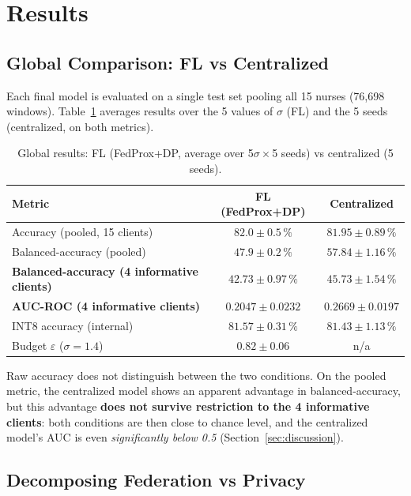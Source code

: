 \documentclass{acmart}
\begin{document}
\section{Results}
\label{sec:results}

\subsection{Global Comparison: FL vs Centralized}

Each final model is evaluated on a single test set pooling all 15 nurses
(76,698 windows). Table~\ref{tab:main} averages results over the 5 values of
$\sigma$ (FL) and the 5 seeds (centralized, on both metrics).

\begin{table}[h!]
\centering
\small
\caption{Global results: FL (FedProx+DP, average over 5$\sigma\times$5 seeds) vs
centralized (5 seeds).}
\label{tab:main}
\begin{tabular}{lcc}
\toprule
Metric & FL (FedProx+DP) & Centralized \\
\midrule
Accuracy (pooled, 15 clients)               & $82.0\pm0.5\,\%$  & $81.95\pm0.89\,\%$ \\
Balanced-accuracy (pooled)                  & $47.9\pm0.2\,\%$  & $57.84\pm1.16\,\%$ \\
\textbf{Balanced-accuracy (4 informative clients)}  & $\mathbf{42.73\pm0.97\,\%}$ & $\mathbf{45.73\pm1.54\,\%}$ \\
\textbf{AUC-ROC (4 informative clients)}    & $\mathbf{0.2047\pm0.0232}$ & $\mathbf{0.2669\pm0.0197}$ \\
INT8 accuracy (internal)                    & $81.57\pm0.31\,\%$ & $81.43\pm1.13\,\%$ \\
Budget $\varepsilon$ ($\sigma=1.4$)         & $0.82\pm0.06$      & n/a \\
\bottomrule
\end{tabular}
\end{table}

Raw accuracy does not distinguish between the two conditions. On the pooled metric,
the centralized model shows an apparent advantage in balanced-accuracy, but this
advantage \textbf{does not survive restriction to the 4 informative clients}: both
conditions are then close to chance level, and the centralized model's AUC is even
\emph{significantly below 0.5} (Section~\ref{sec:discussion}).

\subsection{Decomposing Federation vs Privacy}
\end{document}
